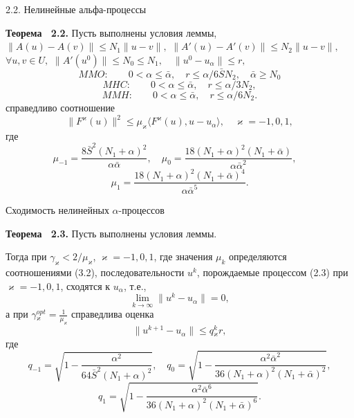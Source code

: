 \documentclass[10pt,pdf, mathserif, hyperref={unicode}]{beamer}
\begin{document}
\begin{frame}{2.2. Нелинейные альфа-процессы}
	\begin{block}{\bf Теорема ~2.2.}
		Пусть выполнены условия леммы, $\|A(u)-A(v)\|\le N_1\|u-v\|,$ \quad $\|A'(u)-A'(v)\|\le N_2\|u-v\|,$ \quad $ \forall u, v \in U,$
		$	\|A'(u^0)\| \le N_0\le N_1, \quad \|u^0-u_\alpha\| \le r,$ 
%		
		$$	MMO:\qquad 0<\alpha\le\bar\alpha, \quad r\le\alpha /6\bar SN_2, \quad \bar\alpha \ge N_0 $$
		$$	MHC:\qquad 0<\alpha\le\bar\alpha, \quad r\le\alpha /3N_2,$$
		$$	MMH:\qquad 0<\alpha\le\bar\alpha, \quad r\le\alpha /6N_2.$$
		справедливо соотношение
		$$\|F^\varkappa(u)\|^2 \le \mu_\varkappa\langle F^\varkappa(u), u-u_\alpha\rangle, \quad \varkappa=-1,0,1,$$ где
		$$\mu _{-1}=\frac{8\bar S^2(N_1+\alpha)^2}{\alpha\bar\alpha}, \quad 
		\mu _0=\frac{18(N_1+\alpha)^2(N_1+\bar\alpha)}{\alpha\bar\alpha ^2}, \quad $$
		$$\mu _1=\frac{18(N_1+\alpha)^2(N_1+\bar\alpha)^4}{\alpha\bar\alpha ^5}.$$
	\end{block}
\end{frame}
\begin{frame}{\small Сходимость нелинейных $\alpha$-процессов}
	\begin{block}{\bf Теорема ~2.3.}
		Пусть выполнены условия леммы. 
		
		Тогда при $\gamma_\varkappa<2/\mu _\varkappa$, $\varkappa=-1,0,1$, где значения $\mu _k$ определяются соотношениями (3.2), последовательности ${u^k}$, порождаемые процессом (2.3) при $\varkappa=-1,0,1$, сходятся к $u_\alpha$, т.е., $$\lim_{k\to\infty}\|u^k-u_\alpha\|=0,$$ а при $
		\gamma{_\varkappa^{opt}}=\frac{1}{\mu_\varkappa}$
		справедлива оценка $$\|u^{k+1}-u_\alpha\|\le q{_\varkappa^k}r,$$ где
		$$q_{-1}=\sqrt{1-\frac{\alpha^2}{64\bar S^2(N_1+\alpha)^2}}, \quad q_0=\sqrt{1-\frac{\alpha^2\bar\alpha^2}{36(N_1+\alpha)^2(N_1+\bar\alpha)^2}},$$
		$$q_1=\sqrt{1-\frac{\alpha^2\bar\alpha^6}{36(N_1+\alpha)^2(N_1+\bar\alpha)^6}}.$$
	\end{block}
\end{frame}
\end{document}
